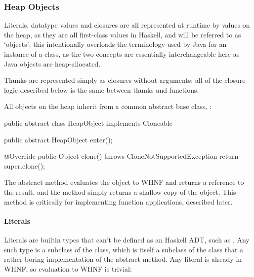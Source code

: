\documentclass[dissertation.tex]{subfiles}
\begin{document}
{{        \subsubsection{Heap Objects}\label{sec:heap-objects}
        {

            Literals, datatype values and closures are all represented at runtime by values on the heap, as they are all
            first-class values in Haskell, and will be referred to as `objects': this intentionally overloads the
            terminology used by Java for an instance of a class, as the two concepts are essentially interchangeable
            here as Java objects are heap-allocated.

            Thunks are represented simply as closures without arguments: all of the closure logic described below is the
            same between thunks and functions.

            All objects on the heap inherit from a common abstract base class, :

            \begin{javafigure}
            public abstract class HeapObject implements Cloneable {
                public abstract HeapObject enter();

                @Override
                public Object clone() throws CloneNotSupportedException {
                    return super.clone();
                }
            }
            \end{javafigure}

            The abstract  method evaluates the object to WHNF and returns a reference to the result, and the
             method simply returns a shallow copy of the object. This method is critically for implementing
            function applications, described later.

            \paragraph*{Literals}\label{sec:literals}
            {
                
                Literals are builtin types that can't be defined as an Haskell ADT, such as . Any such type
                is a subclass of the  class, which is itself a subclass of the  class that a
                rather boring implementation of the abstract  method. Any literal is already in WHNF, so
                evaluation to WHNF is trivial:

}}}}
\end{document}
